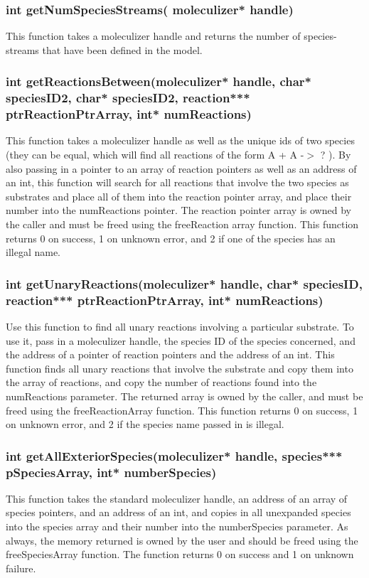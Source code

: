 \subsubsection{int getNumSpeciesStreams( moleculizer* handle)}
This function takes a moleculizer handle and returns the number of
species-streams that have been defined in the model.

\subsubsection{int getReactionsBetween(moleculizer* handle, char*
  speciesID2, char* speciesID2, reaction*** ptrReactionPtrArray,
  int* numReactions)}
This function takes a moleculizer handle as well as the unique ids of
two species (they can be equal, which will find all reactions of the
form A + A -$>$ ? ).  By also passing in a pointer to an array of
reaction pointers as well as an address of an int, this function will
search for all reactions that involve the two species as substrates
and place all of them into the reaction pointer array, and place their
number into the numReactions pointer.  The reaction pointer array is
owned by the caller and must be freed using the freeReaction array
function.  This function returns 0 on success, 1 on unknown error, and
2 if one of the species has an illegal name.  

\subsubsection{int getUnaryReactions(moleculizer* handle, char*
  speciesID, reaction*** ptrReactionPtrArray, int* numReactions)}
Use this function to find all unary reactions involving a particular
substrate.  To use it, pass in a moleculizer handle, the species ID of
the species concerned, and the address of a pointer of reaction
pointers and the address of an int.  This function finds all unary
reactions that involve the substrate and copy them into the array of
reactions, and copy the number of reactions found into the
numReactions parameter.  The returned array is owned by the caller,
and must be freed using the freeReactionArray function.  This function
returns 0 on success, 1 on unknown error, and 2 if the species name
passed in is illegal.

\subsubsection{int getAllExteriorSpecies(moleculizer* handle,
  species*** pSpeciesArray, int* numberSpecies)}
This function takes the standard moleculizer handle, an address of an
array of species pointers, and an address of an int, and copies in all
unexpanded species into the species array and their number into the
numberSpecies parameter.  As always, the memory returned is owned by
the user and should be freed using the freeSpeciesArray function.  The
function returns 0 on success and 1 on unknown failure.

